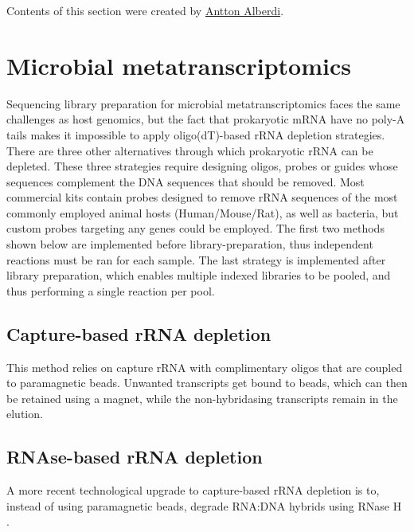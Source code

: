 \documentclass[
]{book}
\begin{document}
Contents of this section were created by \protect\hyperlink{antton-alberdi}{Antton Alberdi}.

\hypertarget{library-microbial-metatranscriptomics}{%
\section{Microbial metatranscriptomics}\label{library-microbial-metatranscriptomics}}

Sequencing library preparation for microbial metatranscriptomics faces the same challenges as host genomics, but the fact that prokaryotic mRNA have no poly-A tails makes it impossible to apply oligo(dT)-based rRNA depletion strategies. There are three other alternatives through which prokaryotic rRNA can be depleted. These three strategies require designing oligos, probes or guides whose sequences complement the DNA sequences that should be removed. Most commercial kits contain probes designed to remove rRNA sequences of the most commonly employed animal hosts (Human/Mouse/Rat), as well as bacteria, but custom probes targeting any genes could be employed. The first two methods shown below are implemented before library-preparation, thus independent reactions must be ran for each sample. The last strategy is implemented after library preparation, which enables multiple indexed libraries to be pooled, and thus performing a single reaction per pool.

\hypertarget{capture-based-rrna-depletion}{%
\subsection*{Capture-based rRNA depletion}\label{capture-based-rrna-depletion}}

This method relies on capture rRNA with complimentary oligos that are coupled to paramagnetic beads. Unwanted transcripts get bound to beads, which can then be retained using a magnet, while the non-hybridasing transcripts remain in the elution.

\hypertarget{rnase-based-rrna-depletion}{%
\subsection*{RNAse-based rRNA depletion}\label{rnase-based-rrna-depletion}}

A more recent technological upgrade to capture-based rRNA depletion is to, instead of using paramagnetic beads, degrade RNA:DNA hybrids using RNase H \citep{Huang2020-xf}.
\end{document}

